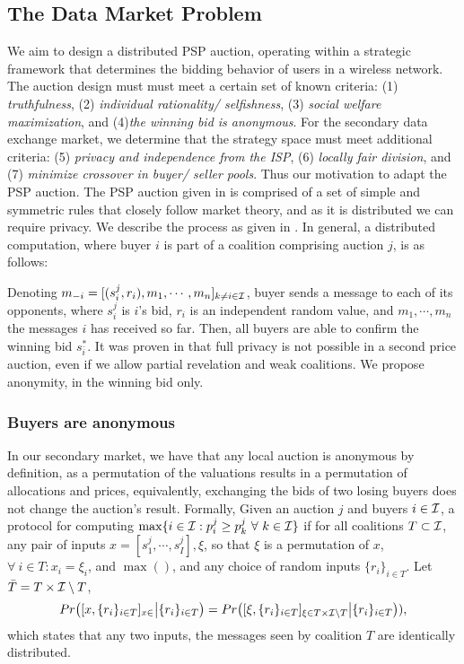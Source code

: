 \subsection{The Data Market Problem}

We aim to design a distributed PSP auction, operating within a strategic framework that
determines the bidding behavior of users in a wireless network.
The auction design must must meet a certain set of known
criteria: (1) \emph{truthfulness}, (2) \emph{individual rationality/
selfishness}, (3) \emph{social welfare maximization}, and (4)\emph{the winning
bid is anonymous}. For the secondary data exchange
market, we determine that the
strategy space must meet additional criteria: (5) \emph{privacy and
independence from the ISP}, (6) \emph{locally fair division}, and (7)
\emph{minimize crossover in buyer/ seller pools}.
Thus our motivation to adapt the PSP auction. The PSP auction given in
\cite{lazar} is comprised of a set of simple and symmetric rules that closely
follow market theory, and as it is distributed we can require privacy. We describe the process as given in \cite{felix}. In general, a distributed
computation, where buyer $i$ is part of a coalition comprising auction $j$, is as follows: 

Denoting $m_{-i} = [(s_i^j, r_i), m_1, \cdots, m_n]_{k\ne i\in \mathcal{I}}$, buyer sends a
message to each of its opponents, where $s_i^j$ is $i$'s bid, $r_i$
is an independent random value, and $m_1, \cdots, m_n$ the messages $i$ has
received so far. Then, all buyers are able to confirm the winning bid $s_{\bar{i}}^*$. 
It was proven in \cite{felix} that full privacy is not possible in a second price auction, even if we allow partial revelation and weak coalitions. We propose anonymity, in the winning bid only.

\subsubsection{Buyers are anonymous}
In our secondary market, we have that any local auction is anonymous by definition, as a permutation of
the valuations results in a permutation of allocations and prices, equivalently,
exchanging the bids of two losing buyers does not change the auction's result.
Formally,
 \cite{felix}
Given an auction $j$ and buyers $i\in\mathcal{I}$, a protocol for computing
$\max\lbrace i \in\mathcal{I} : p_i^j \ge p_k^j \ \forall \ k\in\mathcal{I}\rbrace$ if for
all coalitions $T\subset \mathcal{I}$, any pair of inputs $x = [s_1^j, \cdots,
s_I^j], \xi$, so that $\xi$ is a permutation of $x$, $\forall \ i \in T : x_i =
\xi_i$, and $\max( )$, and any choice of random inputs $\lbrace
r_i\rbrace_{i\in T}$. Let $\bar{T} =   T \times \mathcal{I} \setminus T$, 
$$
    Pr\big([x, \lbrace r_i\rbrace_{i\in T}]_{x\in}
    \big\vert
    \lbrace r_i\rbrace_{i\in T}\big) = Pr\big([\xi, \lbrace r_i\rbrace_{i\in T}]_{\xi\in T
    \times \mathcal{I} \setminus T}\big\vert
    \lbrace r_i\rbrace_{i\in T}\big)),
$$
which states that any two inputs, the messages seen by coalition $T$
are identically distributed.

